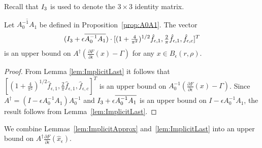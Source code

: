 Recall that $I_3$ is used to denote the $ 3 \times 3 $ identity matrix.
\begin{corollary}
	\label{cor:QUpperBound}
Let $\overline{A_0^{-1} A_1} $ be defined in Proposition~\ref{prop:A0A1}.	
The vector 
	\[
	(I_3+\epsilon \overline{A_0^{-1} A_1} ) \cdot  [(1+\tfrac{4}{\pi^2})^{1/2}\hat{f}_{\epsilon,1},\tfrac{2}{\pi} \hat{f}_{\epsilon,1}, \hat{f}_{\epsilon,c}]^{T}
	\]
	is an upper bound on $ A^\dagger ( \tfrac{\partial F}{\partial  \epsilon} (x) -\Gamma ) $ for any $x \in B_\epsilon(r,\rho)$.
\end{corollary}
\begin{sloppypar}
\begin{proof}
	From Lemma \ref{lem:ImplicitLast} it follows that 
$
[(1+\tfrac{4}{\pi^2})^{1/2}\hat{f}_{\epsilon,1},\tfrac{2}{\pi} \hat{f}_{\epsilon,1}, \hat{f}_{\epsilon,c}]^T
$
	is an upper bound on $A_0^{-1}  ( \tfrac{\partial F}{\partial  \epsilon} (x) -\Gamma )$. 
Since 
	$A^\dagger = (I-\epsilon A_0^{-1}A_1) A_0^{-1}$ and 
	$I_3+\epsilon \overline{A_0^{-1} A_1}$ is an upper bound on $I-\epsilon A_0^{-1}A_1$, the result follows from  Lemma~\ref{lem:ImplicitLast}. 
\end{proof}
\end{sloppypar}


We combine Lemmas~\ref{lem:ImplicitApprox} and~\ref{lem:ImplicitLast}
into an upper bound on $A^{\dagger} \frac{\partial F}{\partial  \epsilon}(\hat{x}_\epsilon)$.

